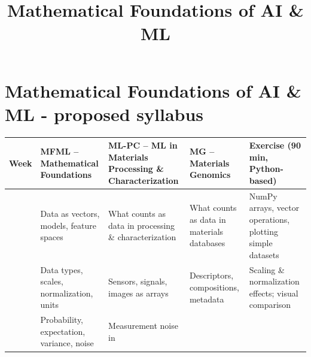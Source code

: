 \documentclass[
]{agujournal2019}
\begin{document}
\title{Mathematical Foundations of AI \& ML}










\section{Mathematical Foundations of AI \& ML - proposed
syllabus}\label{mathematical-foundations-of-ai-ml---proposed-syllabus}

\begin{longtable}[]{@{}
  >{\raggedright\arraybackslash}p{}
  >{\raggedright\arraybackslash}p{}
  >{\raggedright\arraybackslash}p{}
  >{\raggedright\arraybackslash}p{}
  >{\raggedright\arraybackslash}p{}@{}}
\toprule\noalign{}
\begin{minipage}[b]{\linewidth}\raggedright
Week
\end{minipage} & \begin{minipage}[b]{\linewidth}\raggedright
MFML -- Mathematical Foundations
\end{minipage} & \begin{minipage}[b]{\linewidth}\raggedright
ML-PC -- ML in Materials Processing \& Characterization
\end{minipage} & \begin{minipage}[b]{\linewidth}\raggedright
MG -- Materials Genomics
\end{minipage} & \begin{minipage}[b]{\linewidth}\raggedright
Exercise (90 min, Python-based)
\end{minipage} \\
\midrule\noalign{}
\endhead
\bottomrule\noalign{}
\endlastfoot
1 & Data as vectors, models, feature spaces & What counts as data in
processing \& characterization & What counts as data in materials
databases & NumPy arrays, vector operations, plotting simple datasets \\
2 & Data types, scales, normalization, units & Sensors, signals, images
as arrays & Descriptors, compositions, metadata & Scaling \&
normalization effects; visual comparison \\
3 & Probability, expectation, variance, noise & Measurement noise in

\end{longtable}
\end{document}
